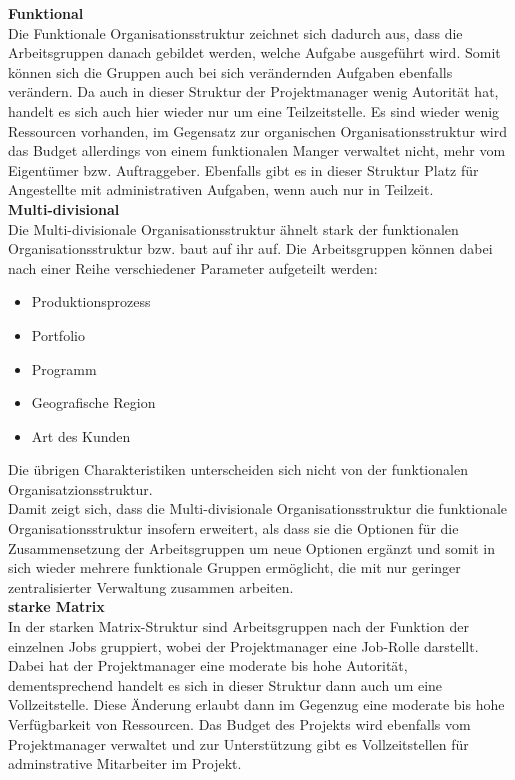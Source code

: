\documentclass[ThesisDJ.tex]{subfiles}
\begin{document}
\textbf{Funktional}\\
Die Funktionale Organisationsstruktur zeichnet sich dadurch aus, dass die Arbeitsgruppen danach gebildet werden, welche Aufgabe ausgeführt wird. Somit können sich die Gruppen auch bei sich verändernden Aufgaben ebenfalls verändern. Da auch in dieser Struktur der Projektmanager wenig Autorität hat, handelt es sich auch hier wieder nur um eine Teilzeitstelle. Es sind wieder wenig Ressourcen vorhanden, im Gegensatz zur organischen Organisationsstruktur wird das Budget allerdings von einem funktionalen Manger verwaltet nicht, mehr vom Eigentümer bzw. Auftraggeber. Ebenfalls gibt es in dieser Struktur Platz für Angestellte mit administrativen Aufgaben, wenn auch nur in Teilzeit. \medskip\\

\textbf{Multi-divisional}\\
Die Multi-divisionale Organisationsstruktur ähnelt stark der funktionalen Organisationsstruktur bzw. baut auf ihr auf. Die Arbeitsgruppen können dabei nach einer Reihe verschiedener Parameter aufgeteilt werden:\\
\begin{itemize}
\item Produktionsprozess
\item Portfolio
\item Programm
\item Geografische Region
\item Art des Kunden
\end{itemize}
Die übrigen Charakteristiken unterscheiden sich nicht von der funktionalen Organisatzionsstruktur.\\
Damit zeigt sich, dass die Multi-divisionale Organisationsstruktur die funktionale Organisationsstruktur insofern erweitert, als dass sie die Optionen für die Zusammensetzung der Arbeitsgruppen um neue Optionen ergänzt und somit in sich wieder mehrere funktionale Gruppen ermöglicht, die mit nur geringer zentralisierter Verwaltung zusammen arbeiten. \medskip\\ 

\textbf{starke Matrix}\\
In der starken Matrix-Struktur sind Arbeitsgruppen nach der Funktion der einzelnen Jobs gruppiert, wobei der Projektmanager eine Job-Rolle darstellt. Dabei hat der Projektmanager eine moderate bis hohe Autorität, dementsprechend handelt es sich in dieser Struktur dann auch um eine Vollzeitstelle. Diese Änderung erlaubt dann im Gegenzug eine moderate bis hohe Verfügbarkeit von Ressourcen. Das Budget des Projekts wird ebenfalls vom Projektmanager verwaltet und zur Unterstützung gibt es Vollzeitstellen für adminstrative Mitarbeiter im Projekt.\medskip\\
\end{document}
